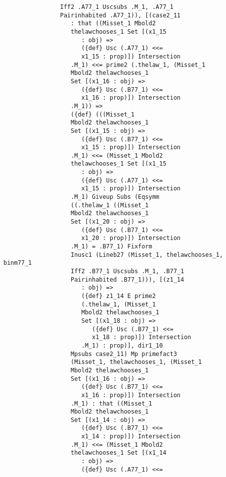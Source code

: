 \documentclass[12pt]{article}
\begin{document}
\begin{verbatim}
                Iff2 .A77_1 Uscsubs .M_1, .A77_1 
                Pairinhabited .A77_1)), [(case2_11 
                   : that ((Misset_1 Mbold2 
                   thelawchooses_1 Set [(x1_15 
                      : obj) => 
                      ({def} Usc (.A77_1) <<= 
                      x1_15 : prop)]) Intersection 
                   .M_1) <<= prime2 (.thelaw_1, (Misset_1 
                   Mbold2 thelawchooses_1 
                   Set [(x1_16 : obj) => 
                      ({def} Usc (.B77_1) <<= 
                      x1_16 : prop)]) Intersection 
                   .M_1)) => 
                   ({def} (((Misset_1 
                   Mbold2 thelawchooses_1 
                   Set [(x1_15 : obj) => 
                      ({def} Usc (.B77_1) <<= 
                      x1_15 : prop)]) Intersection 
                   .M_1) <<= (Misset_1 Mbold2 
                   thelawchooses_1 Set [(x1_15 
                      : obj) => 
                      ({def} Usc (.A77_1) <<= 
                      x1_15 : prop)]) Intersection 
                   .M_1) Giveup Subs (Eqsymm 
                   ((.thelaw_1 ((Misset_1 
                   Mbold2 thelawchooses_1 
                   Set [(x1_20 : obj) => 
                      ({def} Usc (.B77_1) <<= 
                      x1_20 : prop)]) Intersection 
                   .M_1) = .B77_1) Fixform 
                   Inusc1 (Lineb27 (Misset_1, thelawchooses_1, binm77_1 
                   Iff2 .B77_1 Uscsubs .M_1, .B77_1 
                   Pairinhabited .B77_1))), [(z1_14 
                      : obj) => 
                      ({def} z1_14 E prime2 
                      (.thelaw_1, (Misset_1 
                      Mbold2 thelawchooses_1 
                      Set [(x1_18 : obj) => 
                         ({def} Usc (.B77_1) <<= 
                         x1_18 : prop)]) Intersection 
                      .M_1) : prop)], dir1_10 
                   Mpsubs case2_11) Mp primefact3 
                   (Misset_1, thelawchooses_1, (Misset_1 
                   Mbold2 thelawchooses_1 
                   Set [(x1_16 : obj) => 
                      ({def} Usc (.B77_1) <<= 
                      x1_16 : prop)]) Intersection 
                   .M_1) : that ((Misset_1 
                   Mbold2 thelawchooses_1 
                   Set [(x1_14 : obj) => 
                      ({def} Usc (.B77_1) <<= 
                      x1_14 : prop)]) Intersection 
                   .M_1) <<= (Misset_1 Mbold2 
                   thelawchooses_1 Set [(x1_14 
                      : obj) => 
                      ({def} Usc (.A77_1) <<= 

\end{verbatim}
\end{document}
